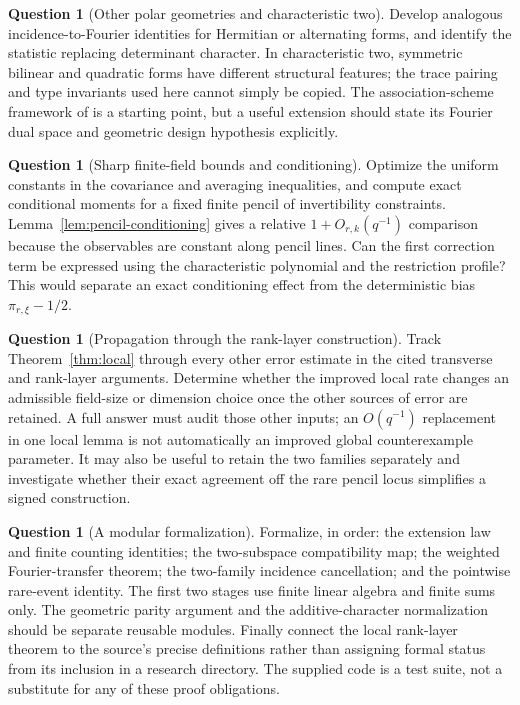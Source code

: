 \documentclass[11pt,a4paper]{article}
\theoremstyle{definition}
\newtheorem{question}[theorem]{Question}
\theoremstyle{remark}
\begin{document}
\begin{question}[Other polar geometries and characteristic two]
Develop analogous incidence-to-Fourier identities for Hermitian or
alternating forms, and identify the statistic replacing determinant
character. In characteristic two, symmetric bilinear and quadratic forms
have different structural features; the trace pairing and type invariants
used here cannot simply be copied. The association-scheme framework of
\cite{schmidt2020} is a starting point, but a useful extension should state
its Fourier dual space and geometric design hypothesis explicitly.
\end{question}

\begin{question}[Sharp finite-field bounds and conditioning]
Optimize the uniform constants in the covariance and averaging inequalities,
and compute exact conditional moments for a fixed finite pencil of
invertibility constraints. Lemma~\ref{lem:pencil-conditioning} gives a
relative $1+O_{r,k}(q^{-1})$ comparison because the observables are constant
along pencil lines. Can the first correction term be expressed using the
characteristic polynomial and the restriction profile? This would separate
an exact conditioning effect from the deterministic bias $\pi_{r,\xi}-1/2$.
\end{question}

\begin{question}[Propagation through the rank-layer construction]
Track Theorem~\ref{thm:local} through every other error estimate in the
cited transverse and rank-layer arguments. Determine whether the improved
local rate changes an admissible field-size or dimension choice once the
other sources of error are retained. A full answer must audit those other
inputs; an $O(q^{-1})$ replacement in one local lemma is not automatically
an improved global counterexample parameter. It may also be useful to
retain the two families separately and investigate whether their exact
agreement off the rare pencil locus simplifies a signed construction.
\end{question}

\begin{question}[A modular formalization]
Formalize, in order: the extension law and finite counting identities;
the two-subspace compatibility map; the weighted Fourier-transfer theorem;
the two-family incidence cancellation; and the pointwise rare-event identity.
The first two stages use finite linear algebra and finite sums only. The
geometric parity argument and the additive-character normalization should
be separate reusable modules. Finally connect the local rank-layer theorem
to the source's precise definitions rather than assigning formal status
from its inclusion in a research directory. The supplied code is a test
suite, not a substitute for any of these proof obligations.
\end{question}
\end{document}
